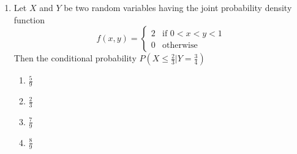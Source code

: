 \documentclass[journal]{IEEEtran}
\numberwithin{equation}{enumi}
\numberwithin{figure}{enumi}
\begin{document}
\begin{enumerate}
    \item Let $X$ and $Y$ be two random variables having the joint probability density function
    \[
    f(x,y) = \begin{cases}
        2 & \text{if } 0 < x < y < 1 \\
        0 & \text{otherwise}
    \end{cases}
    \]
    Then the conditional probability $P ( X \leq \frac{2}{3}| Y = \frac{3}{4})$
    \begin{multicols}{4}
    \begin{enumerate}
        \item $\frac{5}{9}$
        \item $\frac{2}{3}$
        \item $\frac{7}{9}$
        \item $\frac{8}{9}$
    \end{enumerate}
    \end{multicols}

\end{enumerate}
\end{document}
